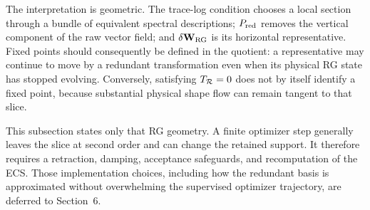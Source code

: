 The interpretation is geometric. The trace-log condition chooses a local section through a bundle of equivalent spectral descriptions; $P_{\mathrm{red}}$ removes the vertical component of the raw vector field; and $\delta\mathbf W_{\rm RG}$ is its horizontal representative. Fixed points should consequently be defined in the quotient: a representative may continue to move by a redundant transformation even when its physical RG state has stopped evolving. Conversely, satisfying $T_{\mathcal R}=0$ does not by itself identify a fixed point, because substantial physical shape flow can remain tangent to that slice.

This subsection states only that RG geometry. A finite optimizer step generally leaves the slice at second order and can change the retained support. It therefore requires a retraction, damping, acceptance safeguards, and recomputation of the ECS. Those implementation choices, including how the redundant basis is approximated without overwhelming the supervised optimizer trajectory, are deferred to Section~6.
